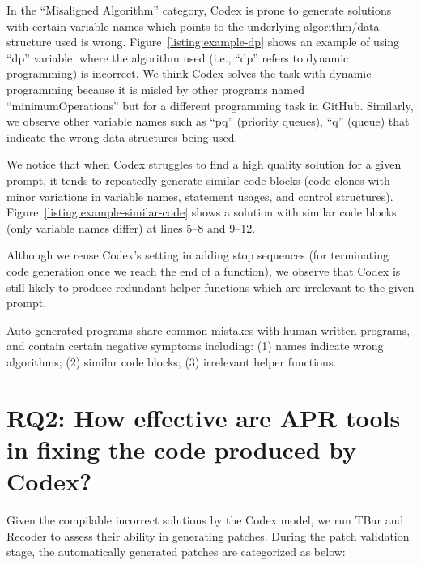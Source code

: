 \begin{description}[leftmargin=*]
\item[\circled{1} \emph{Names indicate Wrong Algorithms:}] In the ``Misaligned Algorithm'' category, Codex is prone to generate solutions with certain variable names which points to the underlying algorithm/data structure used is wrong. Figure~\ref{listing:example-dp} shows an example of using ``dp'' variable, where the algorithm used (i.e., ``dp'' refers to dynamic programming) is incorrect. We think Codex solves the task with dynamic programming because it is misled by other programs named ``minimumOperations'' but for a different programming task in GitHub. Similarly, we observe other variable names such as ``pq'' (priority queues), ``q'' (queue) that indicate the wrong data structures being used.

\item[\circled{2} \emph{Similar Code Blocks:}] We notice that when Codex struggles to find a high quality solution for a given prompt, it tends to repeatedly generate similar code blocks (code clones with minor variations in variable names, statement usages, and control structures). Figure~\ref{listing:example-similar-code} shows a solution with similar code blocks (only variable names differ) at lines 5--8 and 9--12.
\item[\circled{3} \emph{Irrelevant Helper Functions:}] Although we reuse Codex's setting in adding stop sequences (for terminating code generation once we reach the end of a function), we observe that Codex is still likely to produce redundant helper functions which are irrelevant to the given prompt.
\end{description}

\begin{tcolorbox}[left=2pt,right=2pt,top=2pt,bottom=2pt]

Auto-generated programs share common mistakes with human-written programs, and contain certain negative symptoms including: (1) names indicate wrong algorithms; (2) similar code blocks; (3) irrelevant helper functions.

\end{tcolorbox}

\section{RQ2: How effective are APR tools in fixing the code produced by Codex?}
\label{sec:rq2}

Given the compilable incorrect solutions by the Codex model, we run TBar and Recoder to assess their ability in generating patches. During the patch validation stage, the automatically generated patches are categorized as below:

